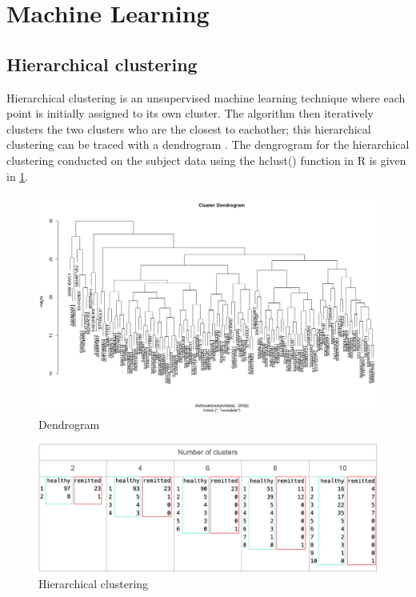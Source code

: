 \documentclass[12pt]{report}
\begin{document}
		\section{Machine Learning}
			\subsection{Hierarchical clustering}
			Hierarchical clustering is an unsupervised machine learning technique where each point is initially assigned to its own cluster. The algorithm then iteratively clusters the two clusters who are the closest to eachother; this hierarchical clustering can be traced with a dendrogram \cite{james2013introduction}. The dengrogram for the hierarchical clustering conducted on the subject data using the hclust() function in R is given in \ref{subjectdatadendrogram}.
			
			\begin{figure}[H]
				\centering
				\includegraphics[scale=0.25]{Images/subjectdata_dendrogram.png}
				\caption{Dendrogram}
				\label{subjectdatadendrogram}
			\end{figure}
			
			\begin{figure}[H]
				\centering
				\includegraphics[scale=0.35]{Images/subjectdata_hclust.png}
				\caption{Hierarchical clustering}
				\label{subjectdatahclust}
			\end{figure}
			
\end{document}
